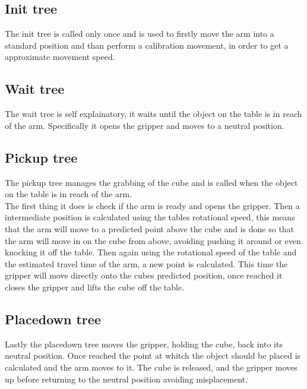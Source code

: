 \documentclass[report]{iisthesis}
\begin{document}
\subsection{Init tree}
The init tree is called only once and is used to firstly move the arm into a standard position and than perform a calibration movement, in order to get a approximate movement speed. 

\subsection{Wait tree}
The wait tree is self explainatory, it waits until the object on the table is in reach of the arm.
Specifically it opens the gripper and moves to a neutral position.

\subsection{Pickup tree}
The pickup tree manages the grabbing of the cube and is called when the object on the table is in reach of the arm. \\
The first thing it does is check if the arm is ready and opens the gripper. Then a intermediate position is calculated using the tables rotational speed, this means that the arm will move to a predicted point above the cube and is done
so that the arm will move in on the cube from above, avoiding pushing it around or even knocking it off the table. Then again using the rotational speed of the table and the estimated travel time of the arm, a new point is calculated.
This time the gripper will move directly onto the cubes predicted position, once reached it closes the gripper and lifts the cube off the table.

\subsection{Placedown tree}
Lastly the placedown tree moves the gripper, holding the cube, back into its neutral position. Once reached the point at whitch the object should be placed is calculated and the arm moves to it.
The cube is released, and the gripper moves up before returning to the neutral position avoiding misplacement.
\end{document}
